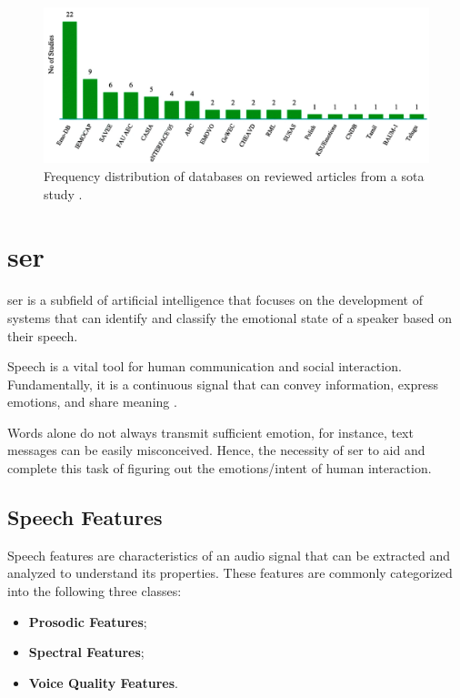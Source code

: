 \begin{figure}[h]
	\centering
	\includegraphics[width=\linewidth]{figs/2_state_of_the_art/sota.png}
	\caption{Frequency distribution of databases on reviewed articles from a \ac{sota} study \cite{Jahangir2021}.}
	\label{fig:databases}
\end{figure}

\section{\acl{ser}}

\ac{ser} is a subfield of artificial intelligence that focuses on the development of systems that can identify and classify the emotional state of a speaker based on their speech.

Speech is a vital tool for human communication and social interaction. Fundamentally, it is a continuous signal that can convey information, express emotions, and share meaning \cite{Narayanan2013}.

Words alone do not always transmit sufficient emotion, for instance, text messages can be easily misconceived. Hence, the necessity of \ac{ser} to aid and complete this task of figuring out the emotions/intent of human interaction. 

\subsection{Speech Features}

Speech features are characteristics of an audio signal that can be extracted and analyzed to understand its properties. These features are commonly categorized into the following three classes:
\begin{itemize}
	\item \textbf{Prosodic Features};
	\item \textbf{Spectral Features};
	\item \textbf{Voice Quality Features}.
\end{itemize}

